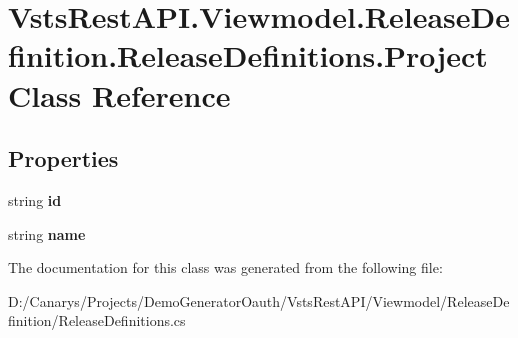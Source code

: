 \hypertarget{class_vsts_rest_a_p_i_1_1_viewmodel_1_1_release_definition_1_1_release_definitions_1_1_project}{}\section{Vsts\+Rest\+A\+P\+I.\+Viewmodel.\+Release\+Definition.\+Release\+Definitions.\+Project Class Reference}
\label{class_vsts_rest_a_p_i_1_1_viewmodel_1_1_release_definition_1_1_release_definitions_1_1_project}
\subsection*{Properties}
\begin{DoxyCompactItemize}
\item 
\mbox{\label{class_vsts_rest_a_p_i_1_1_viewmodel_1_1_release_definition_1_1_release_definitions_1_1_project_a0111e0d37cc6af442ab63fab6b688cba}} 
string {\bfseries id}
\item 
\mbox{\label{class_vsts_rest_a_p_i_1_1_viewmodel_1_1_release_definition_1_1_release_definitions_1_1_project_aef25f2d9fbe17963c52f438e8dcd65ce}} 
string {\bfseries name}
\end{DoxyCompactItemize}


The documentation for this class was generated from the following file\+:\begin{DoxyCompactItemize}
\item 
D\+:/\+Canarys/\+Projects/\+Demo\+Generator\+Oauth/\+Vsts\+Rest\+A\+P\+I/\+Viewmodel/\+Release\+Definition/Release\+Definitions.\+cs\end{DoxyCompactItemize}
